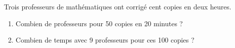 \begin{exercice*}
   Trois professeurs de mathématiques ont corrigé cent copies en deux heures.
   \begin{enumerate}
      \item Combien de professeurs pour 50 copies en 20 minutes ?
      \item Combien de temps avec 9 professeurs pour ces 100 copies ?
   \end{enumerate}
\end{exercice*}